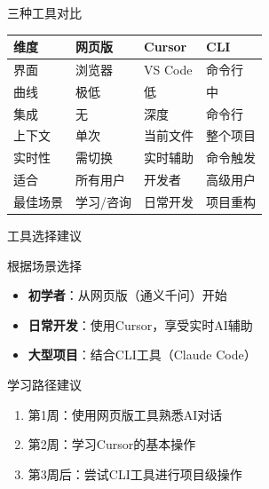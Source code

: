 \begin{frame}{三种工具对比}
	\begin{table}
		\centering
		\scriptsize
		\begin{tabular}{p{2cm}p{2.5cm}p{2.5cm}p{2.5cm}}
			\toprule
			\textbf{维度} & \textbf{网页版} & \textbf{Cursor} & \textbf{CLI} \\
			\midrule
			界面 & 浏览器 & VS Code & 命令行 \\
			曲线 & 极低 & 低 & 中 \\
			集成 & 无 & 深度 & 命令行 \\
			上下文 & 单次 & 当前文件 & 整个项目 \\
			实时性 & 需切换 & 实时辅助 & 命令触发 \\
			适合 & 所有用户 & 开发者 & 高级用户 \\
			最佳场景 & 学习/咨询 & 日常开发 & 项目重构 \\
			\bottomrule
		\end{tabular}
	\end{table}
\end{frame}

\begin{frame}{工具选择建议}
	\begin{block}{根据场景选择}
		\begin{itemize}
			\item \textbf{初学者}：从网页版（通义千问）开始
			\item \textbf{日常开发}：使用Cursor，享受实时AI辅助
			\item \textbf{大型项目}：结合CLI工具（Claude Code）
		\end{itemize}
	\end{block}

	\vspace{0.3cm}

	\begin{block}{学习路径建议}
		\begin{enumerate}
			\item 第1周：使用网页版工具熟悉AI对话
			\item 第2周：学习Cursor的基本操作
			\item 第3周后：尝试CLI工具进行项目级操作
		\end{enumerate}
	\end{block}
\end{frame}

